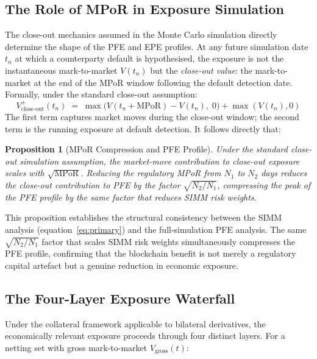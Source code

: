 \documentclass[12pt,letterpaper]{article}
\numberwithin{equation}{section}
\newtheorem{proposition}{Proposition}[section]
\theoremstyle{remark}
\newcommand{\MPoR}{\mathrm{MPoR}}
\begin{document}
\subsection{The Role of MPoR in Exposure Simulation}

The close-out mechanics assumed in the Monte Carlo simulation directly
determine the shape of the PFE and EPE profiles. At any future simulation
date $t_n$ at which a counterparty default is hypothesised, the exposure
is not the instantaneous mark-to-market $V(t_n)$ but the \emph{close-out
value}: the mark-to-market at the end of the MPoR window following the
default detection date. Formally, under the standard close-out assumption:
\begin{equation}
  V^+_{\text{close-out}}(t_n) \;=\;
  \max\bigl(V(t_n + \MPoR) - V(t_n),\; 0\bigr)
  + \max(V(t_n), 0)
  \label{eq:closeout}
\end{equation}
The first term captures market moves during the close-out window; the
second term is the running exposure at default detection. It follows
directly that:

\begin{proposition}[MPoR Compression and PFE Profile]
  Under the standard close-out simulation assumption, the market-move
  contribution to close-out exposure scales with $\sqrt{\MPoR}$. Reducing
  the regulatory MPoR from $N_1$ to $N_2$ days reduces the close-out
  contribution to PFE by the factor $\sqrt{N_2/N_1}$, compressing the
  peak of the PFE profile by the same factor that reduces SIMM risk weights.
\end{proposition}

This proposition establishes the structural consistency between the SIMM
analysis (equation~\ref{eq:primary}) and the full-simulation PFE analysis.
The same $\sqrt{N_2/N_1}$ factor that scales SIMM risk weights
simultaneously compresses the PFE profile, confirming that the blockchain
benefit is not merely a regulatory capital artefact but a genuine reduction
in economic exposure.

\subsection{The Four-Layer Exposure Waterfall}

Under the collateral framework applicable to bilateral derivatives, the
economically relevant exposure proceeds through four distinct layers.
For a netting set with gross mark-to-market $V_{\text{gross}}(t)$:
\end{document}
